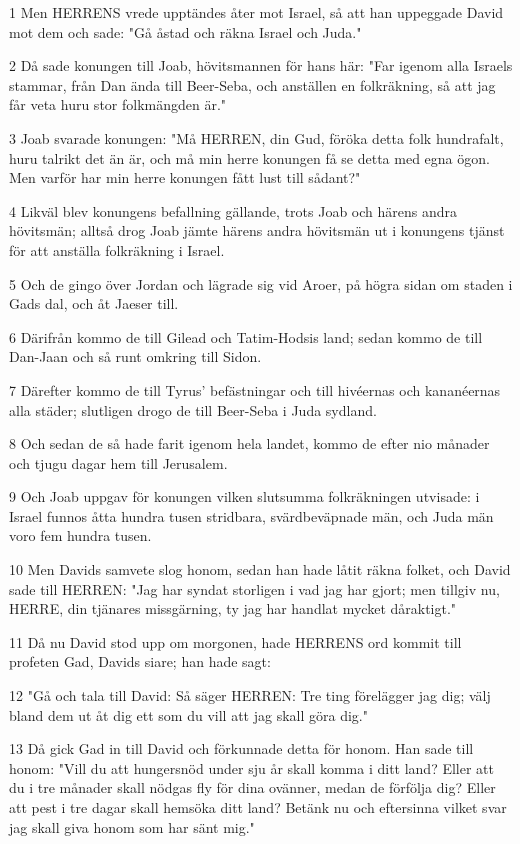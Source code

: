 \par 1 Men HERRENS vrede upptändes åter mot Israel, så att han uppeggade David mot dem och sade: "Gå åstad och räkna Israel och Juda."
\par 2 Då sade konungen till Joab, hövitsmannen för hans här: "Far igenom alla Israels stammar, från Dan ända till Beer-Seba, och anställen en folkräkning, så att jag får veta huru stor folkmängden är."
\par 3 Joab svarade konungen: "Må HERREN, din Gud, föröka detta folk hundrafalt, huru talrikt det än är, och må min herre konungen få se detta med egna ögon. Men varför har min herre konungen fått lust till sådant?"
\par 4 Likväl blev konungens befallning gällande, trots Joab och härens andra hövitsmän; alltså drog Joab jämte härens andra hövitsmän ut i konungens tjänst för att anställa folkräkning i Israel.
\par 5 Och de gingo över Jordan och lägrade sig vid Aroer, på högra sidan om staden i Gads dal, och åt Jaeser till.
\par 6 Därifrån kommo de till Gilead och Tatim-Hodsis land; sedan kommo de till Dan-Jaan och så runt omkring till Sidon.
\par 7 Därefter kommo de till Tyrus' befästningar och till hivéernas och kananéernas alla städer; slutligen drogo de till Beer-Seba i Juda sydland.
\par 8 Och sedan de så hade farit igenom hela landet, kommo de efter nio månader och tjugu dagar hem till Jerusalem.
\par 9 Och Joab uppgav för konungen vilken slutsumma folkräkningen utvisade: i Israel funnos åtta hundra tusen stridbara, svärdbeväpnade män, och Juda män voro fem hundra tusen.
\par 10 Men Davids samvete slog honom, sedan han hade låtit räkna folket, och David sade till HERREN: "Jag har syndat storligen i vad jag har gjort; men tillgiv nu, HERRE, din tjänares missgärning, ty jag har handlat mycket dåraktigt."
\par 11 Då nu David stod upp om morgonen, hade HERRENS ord kommit till profeten Gad, Davids siare; han hade sagt:
\par 12 "Gå och tala till David: Så säger HERREN: Tre ting förelägger jag dig; välj bland dem ut åt dig ett som du vill att jag skall göra dig."
\par 13 Då gick Gad in till David och förkunnade detta för honom. Han sade till honom: "Vill du att hungersnöd under sju år skall komma i ditt land? Eller att du i tre månader skall nödgas fly för dina ovänner, medan de förfölja dig? Eller att pest i tre dagar skall hemsöka ditt land? Betänk nu och eftersinna vilket svar jag skall giva honom som har sänt mig."
